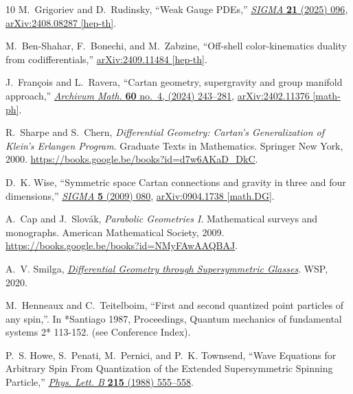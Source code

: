 \documentclass[a4paper,12pt]{article}
\numberwithin{equation}{section} %
\numberwithin{equation}{section}
\begin{document}
\begin{thebibliography}{10}
M.~Grigoriev and D.~Rudinsky, ``{Weak Gauge PDEs},'' \href{http://dx.doi.org/10.3842/SIGMA.2025.096}{{\em SIGMA} {\bfseries 21} (2025) 096}, \href{http://arxiv.org/abs/2408.08287}{{\ttfamily arXiv:2408.08287 [hep-th]}}.

M.~Ben-Shahar, F.~Bonechi, and M.~Zabzine, ``{Off-shell color-kinematics duality from codifferentials},'' \href{http://arxiv.org/abs/2409.11484}{{\ttfamily arXiv:2409.11484 [hep-th]}}.

J.~Fran{\c{c}}ois and L.~Ravera, ``{Cartan geometry, supergravity and group manifold approach},'' \href{http://dx.doi.org/10.5817/AM2024-4-243}{{\em Archivum Math.} {\bfseries 60} no.~4, (2024) 243--281}, \href{http://arxiv.org/abs/2402.11376}{{\ttfamily arXiv:2402.11376 [math-ph]}}.

R.~Sharpe and S.~Chern, {\em Differential Geometry: Cartan's Generalization of Klein's Erlangen Program}.
\newblock Graduate Texts in Mathematics. Springer New York, 2000.
\newblock \url{https://books.google.be/books?id=d7w6AKaD_DkC}.

D.~K. Wise, ``{Symmetric space Cartan connections and gravity in three and four dimensions},'' \href{http://dx.doi.org/10.3842/SIGMA.2009.080}{{\em SIGMA} {\bfseries 5} (2009) 080},
\href{http://arxiv.org/abs/0904.1738}{{\ttfamily arXiv:0904.1738 [math.DG]}}.

A.~Cap and J.~Slov{\'a}k, {\em Parabolic Geometries I}.
\newblock Mathematical surveys and monographs. American Mathematical Society, 2009.
\newblock \url{https://books.google.be/books?id=NMyFAwAAQBAJ}.

A.~V. Smilga, \href{http://dx.doi.org/10.1142/11457}{{\em {Differential Geometry through Supersymmetric Glasses}}}.
\newblock WSP, 2020.

M.~Henneaux and C.~Teitelboim, ``{F}irst and second quantized point particles of any spin,''. In *Santiago 1987, Proceedings, Quantum mechanics of fundamental systems 2* 113-152. (see Conference Index).

P.~S. Howe, S.~Penati, M.~Pernici, and P.~K. Townsend, ``{Wave Equations for Arbitrary Spin From Quantization of the Extended Supersymmetric Spinning Particle},'' \href{http://dx.doi.org/10.1016/0370-2693(88)91358-5}{{\em Phys. Lett. B} {\bfseries 215} (1988) 555--558}.


\end{thebibliography}
\end{document}
